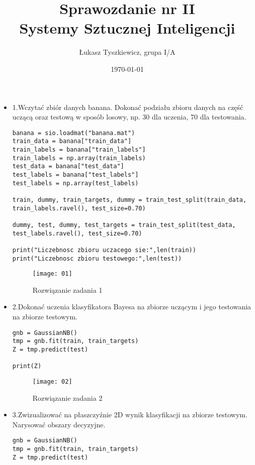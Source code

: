 \documentclass[12pt,a4paper]{article}
\begin{document}
	
	\title{Sprawozdanie nr II\\Systemy Sztucznej Inteligencji}
	\author{Łukasz Tyszkiewicz, grupa I/A}
	\date{\today}
	
	\maketitle
	\begin{itemize}
		\item 1.Wczytać zbiór danych banana. Dokonać podziału zbioru danych na część uczącą oraz testową w sposób losowy, np. 30 dla uczenia, 70 dla testowania.
	\begin{lstlisting}
banana = sio.loadmat("banana.mat")
train_data = banana["train_data"]
train_labels = banana["train_labels"]
train_labels = np.array(train_labels)
test_data = banana["test_data"]
test_labels = banana["test_labels"]
test_labels = np.array(test_labels)

train, dummy, train_targets, dummy = train_test_split(train_data, train_labels.ravel(), test_size=0.70)

dummy, test, dummy, test_targets = train_test_split(test_data, test_labels.ravel(), test_size=0.70)

print("Liczebnosc zbioru uczacego sie:",len(train))
print("Liczebnosc zbioru testowego:",len(test))

	\end{lstlisting}
		\begin{figure}[h]
                        \texttt{[image: 01]}
                        \centering
			\caption{Rozwiązanie zadania 1}
			\label{fig:fig1}
                \end{figure}
                \clearpage 

                \item 2.Dokonać uczenia klasyfikatora Bayesa na zbiorze uczącym i jego testowania na zbiorze testowym.
	\begin{lstlisting}
gnb = GaussianNB()
tmp = gnb.fit(train, train_targets)
Z = tmp.predict(test)

print(Z)
	\end{lstlisting}
		\begin{figure}[h]
                        \texttt{[image: 02]}
                        \centering
			\caption{Rozwiązanie zadania 2}
			\label{fig:fig2}
                \end{figure}
                \clearpage 

                \item 3.Zwizualizować na płaszczyźnie 2D wynik klasyfikacji na zbiorze testowym. Narysować obszary decyzyjne.
	\begin{lstlisting}
gnb = GaussianNB()
tmp = gnb.fit(train, train_targets)
Z = tmp.predict(test)


\end{lstlisting}
\end{itemize}
\end{document}
